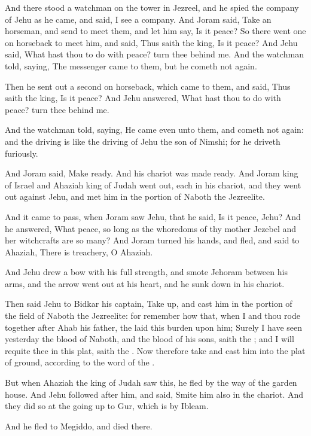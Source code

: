 \verse And there stood a watchman on the tower in Jezreel, and he spied the company of Jehu as he came, and said, I see a company. And Joram said, Take an horseman, and send to meet them, and let him say, Is it peace?  \verse So there went one on horseback to meet him, and said, Thus saith the king, Is it peace? And Jehu said, What hast thou to do with peace? turn thee behind me. And the watchman told, saying, The messenger came to them, but he cometh not again.

\verse Then he sent out a second on horseback, which came to them, and said, Thus saith the king, Is it peace? And Jehu answered, What hast thou to do with peace? turn thee behind me.

\verse And the watchman told, saying, He came even unto them, and cometh not again: and the driving is like the driving of Jehu the son of Nimshi; for he driveth furiously.

\verse And Joram said, Make ready. And his chariot was made ready. And Joram king of Israel and Ahaziah king of Judah went out, each in his chariot, and they went out against Jehu, and met him in the portion of Naboth the Jezreelite.

\verse And it came to pass, when Joram saw Jehu, that he said, Is it peace, Jehu? And he answered, What peace, so long as the whoredoms of thy mother Jezebel and her witchcrafts are so many?  \verse And Joram turned his hands, and fled, and said to Ahaziah, There is treachery, O Ahaziah.

\verse And Jehu drew a bow with his full strength, and smote Jehoram between his arms, and the arrow went out at his heart, and he sunk down in his chariot.

\verse Then said Jehu to Bidkar his captain, Take up, and cast him in the portion of the field of Naboth the Jezreelite: for remember how that, when I and thou rode together after Ahab his father, the \LORD laid this burden upon him; \verse Surely I have seen yesterday the blood of Naboth, and the blood of his sons, saith the \LORD; and I will requite thee in this plat, saith the \LORD. Now therefore take and cast him into the plat of ground, according to the word of the \LORD.

\verse But when Ahaziah the king of Judah saw this, he fled by the way of the garden house. And Jehu followed after him, and said, Smite him also in the chariot. And they did so at the going up to Gur, which is by Ibleam.

And he fled to Megiddo, and died there.


